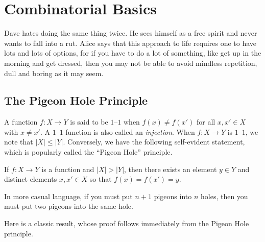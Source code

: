 
\chapter{Combinatorial Basics}\label{ch:basics}

Dave hates doing the same thing twice.  He sees himself
as a free spirit and never wants to fall into a rut.  Alice
says that this approach to life requires one to have lots
and lots of options, for if you have to do a lot of something,
like get up in the morning and get dressed, then you may not
be able to avoid mindless repetition, dull and boring as it
may seem.

\section{The Pigeon Hole Principle}\label{s:basics:pigeonhole}

A function $f:X\longrightarrow Y$ is said to be $1$--$1$ when
$f(x)\neq f(x')$ for all $x,x'\in X$ with $x\neq x'$.  A $1$--$1$
function is also called an \textit{injection}.  When
$f:X\longrightarrow Y$ is $1$--$1$, we note that $|X|\le |Y|$.
Conversely, we have the following self-evident statement, which is
popularly called the ``Pigeon Hole'' principle.

\begin{proposition}\label{prop:pigeon}
If $f:X\longrightarrow Y$ is a function and $|X|>|Y|$, then
there exists an element $y\in Y$ and distinct elements $x,x'\in X$
so that $f(x)=f(x')=y$.
\end{proposition}

In more casual language, if you must put $n+1$ pigeons into $n$ holes,
then you must put two pigeons into the same hole.

Here is a classic result, whose proof follows immediately from
the Pigeon Hole principle.

